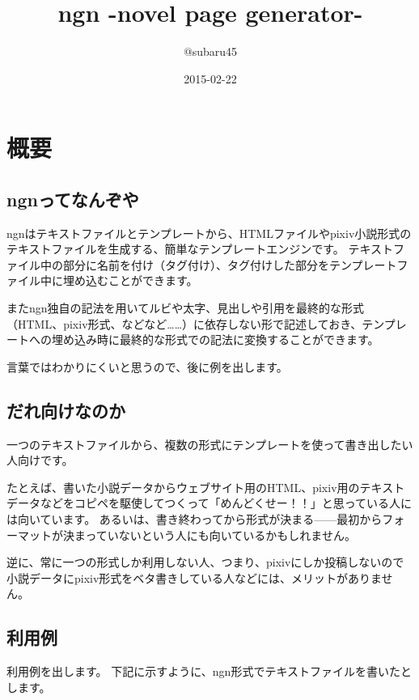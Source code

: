 \documentclass[a4j]{jsarticle}
\begin{document}
\title{ngn -novel page generator-}
\author{@subaru45}
\date{2015-02-22}
\maketitle


\section{概要}

\subsection{ngnってなんぞや}
ngnはテキストファイルとテンプレートから、HTMLファイルやpixiv小説形式のテキストファイルを生成する、簡単なテンプレートエンジンです。
テキストファイル中の部分に名前を付け（タグ付け）、タグ付けした部分をテンプレートファイル中に埋め込むことができます。

またngn独自の記法を用いてルビや太字、見出しや引用を最終的な形式（HTML、pixiv形式、などなど……）に依存しない形で記述しておき、テンプレートへの埋め込み時に最終的な形式での記法に変換することができます。

言葉ではわかりにくいと思うので、後に例を出します。


\subsection{だれ向けなのか}

一つのテキストファイルから、複数の形式にテンプレートを使って書き出したい人向けです。

たとえば、書いた小説データからウェブサイト用のHTML、pixiv用のテキストデータなどをコピペを駆使してつくって「めんどくせー！！」と思っている人には向いています。
あるいは、書き終わってから形式が決まる——最初からフォーマットが決まっていないという人にも向いているかもしれません。

逆に、常に一つの形式しか利用しない人、つまり、pixivにしか投稿しないので小説データにpixiv形式をベタ書きしている人などには、メリットがありません。


\subsection{利用例}


利用例を出します。
下記に示すように、ngn形式でテキストファイルを書いたとします。
\end{document}
